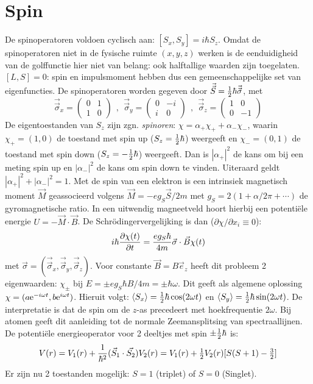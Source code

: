 \documentclass[twoside]{report}
\begin{document}
\section[~~Spin]{Spin}
De spinoperatoren voldoen cyclisch aan: $[S_x,S_y]=i\hbar S_z$. Omdat de
spinoperatoren niet in de fysische ruimte $(x,y,z)$ werken is de
eenduidigheid van de golffunctie hier niet van belang: ook halftallige
waarden zijn toegelaten. $[L,S]=0$: spin en impulsmoment hebben dus een
gemeenschappelijke set van eigenfuncties. De spinoperatoren worden gegeven
door $\vec{\vec{S}}=\mbox{$\frac{1}{2}$}\hbar\vec{\vec{\sigma}}$, met
\[
\vec{\vec{\sigma}}_x=\left(\begin{array}{cc}0&1\\1&0\end{array}\right)~~,~~
\vec{\vec{\sigma}}_y=\left(\begin{array}{cc}0&-i\\i&0\end{array}\right)~~,~~
\vec{\vec{\sigma}}_z=\left(\begin{array}{cc}1&0\\0&-1\end{array}\right)
\]
De eigentoestanden van $S_z$ zijn zgn. {\it spinoren}:
$\chi=\alpha_+\chi_++\alpha_-\chi_-$, waarin $\chi_+=(1,0)$ de toestand met
spin up ($S_z=\mbox{$\frac{1}{2}$}\hbar$) weergeeft en $\chi_-=(0,1)$ de toestand met spin
down ($S_z=-\mbox{$\frac{1}{2}$}\hbar$) weergeeft. Dan is $|\alpha_+|^2$ de kans om bij een
meting spin up en $|\alpha_-|^2$ de kans om spin down te vinden. Uiteraard
geldt $|\alpha_+|^2+|\alpha_-|^2=1$.
\npar
Met de spin van een elektron is een intrinsiek magnetisch moment $\vec{M}$
geassocieerd volgens $\vec{M}=-eg_S\vec{S}/2m$ met $g_S=2(1+\alpha/2\pi+\cdots)$
de gyromagnetische ratio. In een uitwendig magneetveld hoort hierbij een
potenti\"ele energie $U=-\vec{M}\cdot\vec{B}$. De Schr\"odingervergelijking
is dan ($\partial\chi/\partial x_i\equiv0$):
\[
i\hbar\frac{\partial \chi(t)}{\partial t}=\frac{eg_S\hbar}{4m}\vec{\sigma}\cdot\vec{B}\chi(t)
\]
met $\vec{\sigma}=(\vec{\vec{\sigma}}_x,\vec{\vec{\sigma}}_y,\vec{\vec{\sigma}}_z)$.
Voor constante $\vec{B}=B\vec{e}_z$ heeft dit probleem 2 eigenwaarden:
$\chi_\pm$ bij $E=\pm eg_S\hbar B/4m=\pm\hbar\omega$. Dit geeft als algemene
oplossing $\chi=(a{\rm e}^{-i\omega t},b{\rm e}^{i\omega t})$. Hieruit volgt:
$\left\langle S_x \right\rangle=\mbox{$\frac{1}{2}$}\hbar\cos(2\omega t)$ en $\left\langle S_y \right\rangle=\mbox{$\frac{1}{2}$}\hbar\sin(2\omega t)$.
De interpretatie is dat de spin om de $z$-as precedeert met hoekfrequentie
$2\omega$. Bij atomen geeft dit aanleiding tot de normale Zeemansplitsing van
spectraallijnen.
\npar
De potenti\"ele energieoperator voor 2 deeltjes met spin $\pm\mbox{$\frac{1}{2}$}\hbar$ is:
\[
V(r)=V_1(r)+\frac{1}{\hbar^2}(\vec{S}_1\cdot\vec{S_2})V_2(r)=
V_1(r)+\mbox{$\frac{1}{2}$} V_2(r)[S(S+1)-\mbox{$\frac{3}{2}$}]
\]
Er zijn nu 2 toestanden mogelijk: $S=1$ (triplet) of $S=0$ (Singlet).
\end{document}
